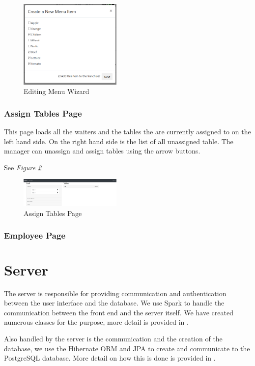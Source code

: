 \documentclass[12pt, twoside, a4paper]{report}
\begin{document}
\begin{figure}[H]
  \centering
  \includegraphics[width=5cm]{editWizard3.png}
  \caption{Editing Menu Wizard}
  \label{fig:editWizard3}
\end{figure}

\subsubsection*{Assign Tables Page}
This page loads all the waiters and the tables the are currently assigned to on the left hand side. On the right hand side is the list of all unassigned table.
The manager can unassign and assign tables using the arrow buttons.

See \textit{Figure \ref{fig:assign}}

\begin{figure}[H]
  \centering
  \includegraphics[width=5cm]{assignTables.png}
  \caption{Assign Tables Page}
  \label{fig:assign}
\end{figure}

\subsubsection*{Employee Page}

\section*{Server}
The server is responsible for providing communication and authentication between the user interface and the database.
We use Spark to handle the communication between the front end and the server itself. We have created numerous classes for the purpose, more detail is provided in \textit{}.

Also handled by the server is the communication and the creation of the database, we use the Hibernate ORM and JPA to create and communicate to the PostgreSQL database. More detail on how this is done is provided in \textit{}.
\end{document}
